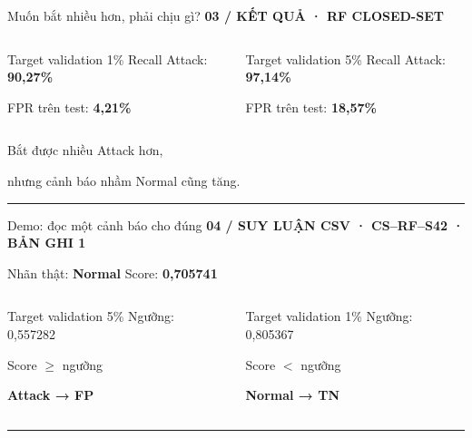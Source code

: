 \documentclass[17pt,aspectratio=169]{beamer}
\newcommand{\eyebrow}[1]{{\small\color{green}\bfseries #1}\par\vspace{2mm}}
\newcommand{\takeaway}[1]{\vfill{\color{green}\rule{\linewidth}{.5pt}}\par\vspace{1mm}{\small #1}}
\begin{document}
\begin{frame}{Muốn bắt nhiều hơn, phải chịu gì?}
\eyebrow{03 / KẾT QUẢ · RF CLOSED-SET}
\begin{columns}[T,onlytextwidth]
\begin{column}{.46\textwidth}
\begin{block}{Target validation 1\%}
Recall Attack: \textbf{90,27\%}\par
FPR trên test: \textbf{4,21\%}
\end{block}
\end{column}
\begin{column}{.46\textwidth}
\begin{block}{Target validation 5\%}
Recall Attack: \textbf{97,14\%}\par
FPR trên test: \textbf{18,57\%}
\end{block}
\end{column}
\end{columns}
\vspace{4mm}
{\large Bắt được nhiều Attack hơn,\par nhưng cảnh báo nhầm Normal cũng tăng.}
\takeaway{Trung bình 5 seed. Target trên validation không bảo đảm FPR bằng target trên test hay dữ liệu mới.}
\end{frame}

\begin{frame}{Demo: đọc một cảnh báo cho đúng}
\eyebrow{04 / SUY LUẬN CSV · CS–RF–S42 · BẢN GHI 1}
{\large Nhãn thật: \textbf{Normal} \hfill Score: \textbf{0,705741}}\par\vspace{4mm}
\begin{columns}[T,onlytextwidth]
\begin{column}{.46\textwidth}
\begin{block}{Target validation 5\%}
Ngưỡng: 0,557282\par
Score $\geq$ ngưỡng\par
\textbf{\color{rust}Attack → FP}
\end{block}
\end{column}
\begin{column}{.46\textwidth}
\begin{block}{Target validation 1\%}
Ngưỡng: 0,805367\par
Score $<$ ngưỡng\par
\textbf{Normal → TN}
\end{block}
\end{column}
\end{columns}
\takeaway{Chỉ đổi ngưỡng, không học lại. FP là cảnh báo nhầm; TN là nhận đúng Normal. Không có nhãn thì chưa kết luận đúng/sai.}
\end{frame}
\end{document}
